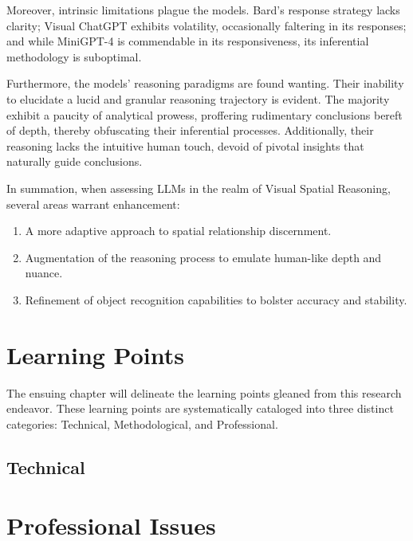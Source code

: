 \documentclass[twocolumn,11pt]{report}
\begin{document}
Moreover, intrinsic limitations plague the models. Bard's response strategy lacks clarity; Visual ChatGPT exhibits volatility, occasionally faltering in its responses; and while MiniGPT-4 is commendable in its responsiveness, its inferential methodology is suboptimal.

Furthermore, the models' reasoning paradigms are found wanting. Their inability to elucidate a lucid and granular reasoning trajectory is evident. The majority exhibit a paucity of analytical prowess, proffering rudimentary conclusions bereft of depth, thereby obfuscating their inferential processes. Additionally, their reasoning lacks the intuitive human touch, devoid of pivotal insights that naturally guide conclusions.

In summation, when assessing LLMs in the realm of Visual Spatial Reasoning, several areas warrant enhancement:
\begin{enumerate}
    \item A more adaptive approach to spatial relationship discernment.
    \item Augmentation of the reasoning process to emulate human-like depth and nuance.
    \item Refinement of object recognition capabilities to bolster accuracy and stability.
\end{enumerate}

\chapter{Learning Points}\label{chap:learning}
The ensuing chapter will delineate the learning points gleaned from this research endeavor. These learning points are systematically cataloged into three distinct categories: Technical, Methodological, and Professional.

\section{Technical}



\chapter{Professional Issues}\label{chap:issues}

\end{document}
